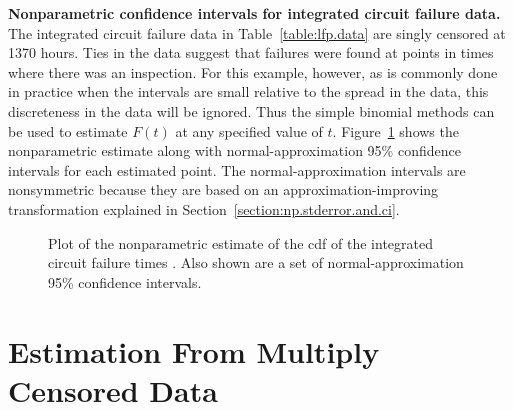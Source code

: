 \begin{example}
{\bf Nonparametric confidence intervals for integrated circuit
failure data.} The integrated circuit failure data in
Table~\ref{table:lfp.data} are singly censored at 1370 hours. Ties
in the data suggest that failures were found at points in times
where there was an inspection. For this example, however, as is
commonly done in practice when the intervals are small relative to
the spread in the data, this discreteness in the data will be
ignored.  Thus the simple binomial methods can be used to estimate
$F(t)$ at any specified value of $t$.
Figure~\ref{figure:lfp.cdf.pw.ps} shows the nonparametric estimate
along with normal-approximation 95\% confidence intervals for each
estimated point.  The normal-approximation intervals are
nonsymmetric because they are based on an approximation-improving
transformation explained in
Section~\ref{section:np.stderror.and.ci}.
\end{example}



\begin{figure}
\caption{Plot of the nonparametric estimate 
of the cdf of the integrated circuit failure times . Also shown are
a set of normal-approximation 95\% confidence intervals.}
\label{figure:lfp.cdf.pw.ps}
\end{figure}

\section{Estimation From Multiply Censored Data}
\label{section:def.model.free.est}

